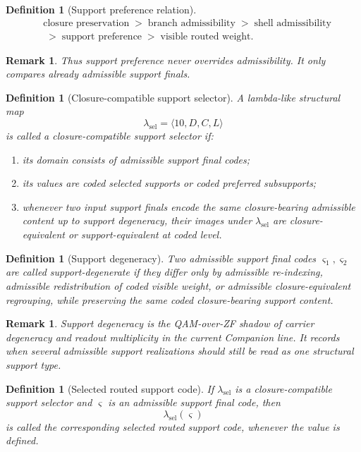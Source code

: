 \documentclass[12pt,a4paper]{article}
\newtheorem{definition}[theorem]{Definition}
\newtheorem{remark}[theorem]{Remark}
\begin{document}
\begin{definition}[Support preference relation]
\[
\begin{aligned}
&\text{closure preservation}
\;>\;
\text{branch admissibility}
\;>\;
\text{shell admissibility}\\[0.2em]
&\;>\;
\text{support preference}
\;>\;
\text{visible routed weight}.
\end{aligned}
\]
\end{definition}

\begin{remark}
Thus support preference never overrides admissibility. It only compares already admissible support finals.
\end{remark}

\begin{definition}[Closure-compatible support selector]
A lambda-like structural map
\[
\lambda_{\mathrm{sel}}=\langle 10,D,C,L\rangle
\]
is called a \emph{closure-compatible support selector} if:
\begin{enumerate}
\item its domain consists of admissible support final codes;
\item its values are coded selected supports or coded preferred subsupports;
\item whenever two input support finals encode the same closure-bearing admissible content up to support degeneracy, their images under $\lambda_{\mathrm{sel}}$ are closure-equivalent or support-equivalent at coded level.
\end{enumerate}
\end{definition}

\begin{definition}[Support degeneracy]
Two admissible support final codes $\varsigma_1,\varsigma_2$ are called \emph{support-degenerate} if they differ only by admissible re-indexing, admissible redistribution of coded visible weight, or admissible closure-equivalent regrouping, while preserving the same coded closure-bearing support content.
\end{definition}

\begin{remark}
Support degeneracy is the QAM-over-ZF shadow of carrier degeneracy and readout multiplicity in the current Companion line. It records when several admissible support realizations should still be read as one structural support type.
\end{remark}

\begin{definition}[Selected routed support code]
If $\lambda_{\mathrm{sel}}$ is a closure-compatible support selector and $\varsigma$ is an admissible support final code, then
\[
\lambda_{\mathrm{sel}}(\varsigma)
\]
is called the corresponding \emph{selected routed support code}, whenever the value is defined.
\end{definition}
\end{document}
